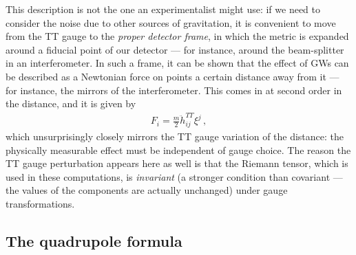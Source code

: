 \documentclass[main.tex]{subfiles}
\begin{document}
This description is not the one an experimentalist might use: if we need to consider the noise due to other sources of gravitation, it is convenient to move from the \ac{TT} gauge to the \emph{proper detector frame}, in which the metric is expanded around a fiducial point of our detector --- for instance, around the beam-splitter in an interferometer.
In such a frame, it can be shown that the effect of \acsp{GW} can be described as a Newtonian force on points a certain distance away from it --- for instance, the mirrors of the interferometer. This comes in at second order in the distance, and it is given by \cite[eq.\ 1.96]{maggioreGravitationalWavesVolume2007}
%
\begin{align}
F_{i} = \frac{m}{2} \ddot{h}_{ij}^{TT} \xi^{j}
\,,
\end{align}
%
which unsurprisingly closely mirrors the \ac{TT} gauge variation of the distance: the physically measurable effect must be independent of gauge choice. 
The reason the \ac{TT} gauge perturbation appears here as well is that the Riemann tensor, which is used in these computations, is \emph{invariant} (a stronger condition than covariant --- the values of the components are actually unchanged) under gauge transformations. 

\subsection{The quadrupole formula}
\end{document}
